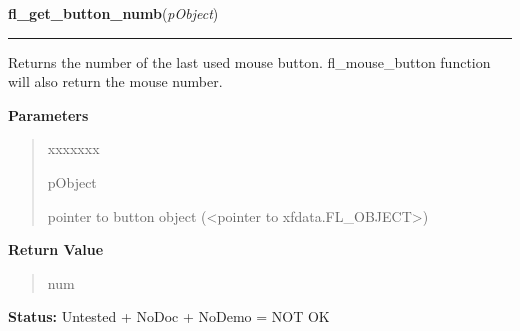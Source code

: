 \hspace{.8\funcindent}\begin{boxedminipage}{\funcwidth}

    \raggedright \textbf{fl\_get\_button\_numb}(\textit{pObject})

    \vspace{-1.5ex}

    \rule{\textwidth}{0.5\fboxrule}
\setlength{\parskip}{2ex}
    Returns the number of the last used mouse button. fl\_mouse\_button 
    function will also return the mouse number.

\setlength{\parskip}{1ex}
      \textbf{Parameters}
      \vspace{-1ex}

      \begin{quote}
        \begin{Ventry}{xxxxxxx}

          \item[pObject]

          pointer to button object ({\textless}pointer to 
          xfdata.FL\_OBJECT{\textgreater})

        \end{Ventry}

      \end{quote}

      \textbf{Return Value}
    \vspace{-1ex}

      \begin{quote}
      num

      \end{quote}

\textbf{Status:} Untested + NoDoc + NoDemo = NOT OK



    \end{boxedminipage}

    \label{xformslib:library:fl_set_object_shortcut}

    \vspace{0.5ex}


